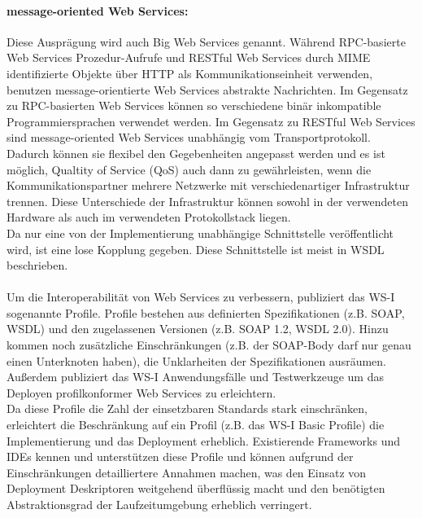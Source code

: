 \documentclass[runningheads]{llncs}
\newcommand{\germanquote}[1]{\glqq{}#1\grqq{}}
\begin{document}
    \paragraph{message-oriented Web Services:}
      Diese Ausprägung wird auch \germanquote{Big Web Services} genannt. Während RPC-basierte Web
      Services Prozedur-Aufrufe und RESTful Web Services durch MIME identifizierte Objekte über
      HTTP als Kommunikationseinheit verwenden, benutzen message-orientierte Web Services abstrakte
      Nachrichten. Im Gegensatz zu RPC-basierten Web Services können so verschiedene binär
      inkompatible Programmiersprachen verwendet werden. Im Gegensatz zu RESTful Web Services sind
      message-oriented Web Services unabhängig vom Transportprotokoll. Dadurch können sie flexibel
      den Gegebenheiten angepasst werden und es ist möglich, \germanquote{Qualtity of Service}
      (QoS) auch dann zu gewährleisten, wenn die Kommunikationspartner mehrere Netzwerke mit
      verschiedenartiger Infrastruktur trennen. Diese Unterschiede der Infrastruktur können sowohl
      in der verwendeten Hardware als auch im verwendeten Protokollstack liegen.\\
      Da nur eine von der Implementierung unabhängige Schnittstelle veröffentlicht wird, ist eine
      lose Kopplung gegeben. Diese Schnittstelle ist meist in WSDL beschrieben.

    \paragraph{}
    Um die Interoperabilität von Web Services zu verbessern, publiziert das WS-I\cite{wsi_hp}
    sogenannte Profile. Profile bestehen aus definierten Spezifikationen (z.B. SOAP, WSDL) und den
    zugelassenen Versionen (z.B. SOAP 1.2, WSDL 2.0). Hinzu kommen noch zusätzliche Einschränkungen
    (z.B. \germanquote{der SOAP-Body darf nur genau einen Unterknoten haben}), die Unklarheiten der
    Spezifikationen ausräumen. Außerdem publiziert das WS-I Anwendungsfälle und Testwerkzeuge um
    das Deployen profilkonformer Web Services zu erleichtern.\\
    Da diese Profile die Zahl der einsetzbaren Standards stark einschränken, erleichtert die
    Beschränkung auf ein Profil (z.B. das \germanquote{WS-I Basic Profile}) die Implementierung und
    das Deployment erheblich. Existierende Frameworks und IDEs kennen und unterstützen diese
    Profile und können aufgrund der Einschränkungen detailliertere Annahmen machen, was den Einsatz
    von Deployment Deskriptoren weitgehend überflüssig macht und den
    benötigten Abstraktionsgrad der Laufzeitumgebung erheblich verringert.
\end{document}
